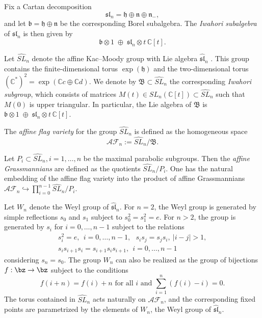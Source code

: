 \documentclass[10pt, a4paper, reqno]{amsart}
\begin{document}
Fix a Cartan decomposition 
\[
\mathfrak{sl}_n = \mathfrak{h} \oplus \mathfrak{n} \oplus \mathfrak{n}_-,
\]
and let $\mathfrak{b} = \mathfrak{h} \oplus \mathfrak{n}$ be the corresponding Borel subalgebra. 
The \emph{Iwahori subalgebra} of $\widehat{\mathfrak{sl}}_n$ is then given by
\[
\mathfrak{b} \otimes 1 \;\oplus\; \mathfrak{sl}_n \otimes t\,\mathbb{C}[t].
\]


Let $\widehat{SL}_n$ denote the affine Kac--Moody group with Lie algebra $\widehat{\mathfrak{sl}}_n$  {\cite{k}}. 
This group contains the finite-dimensional torus $\exp(\mathfrak{h})$ 
and the two-dimensional torus $(\mathbb{C}^*)^2 = \exp(\mathbb{C}c \oplus \mathbb{C}d)$. 
We denote by $\mathfrak{B} \subset \widehat{SL}_n$ the corresponding \emph{Iwahori subgroup}, 
which consists of matrices 
$M(t) \in SL_n(\mathbb{C}[t]) \subset \widehat{SL}_n$ 
such that $M(0)$ is upper triangular. 
In particular, the Lie algebra of $\mathfrak{B}$ is 
$\mathfrak{b} \otimes 1 \;\oplus\; \mathfrak{sl}_n \otimes t\,\mathbb{C}[t]$.


\begin{defe}
	The \emph{affine flag variety} for the group  $\widehat{SL}_n$ is defined as the homogeneous space
	\[
	\mathscr{AF}_n:= \widehat{SL}_n / \mathfrak{B}.
	\]
\end{defe}
Let $P_i\subset \widehat{SL}_n, i=1,\ldots,n$ be the maximal parabolic subgroups. Then the \emph{affine Grassmannians} are defined as the quotients $\widehat{SL}_n/P_i$.  One has the natural embedding of the affine flag variety into the product of affine Grassmannians $\mathscr{AF}_n\hookrightarrow \prod_{i=0}^{n-1} \widehat{SL}_n/P_i$.


\begin{rema}Let $W_n$ denote the Weyl group of $\widehat{\mathfrak{sl}}_n$. For $n=2$, the  Weyl group is generated by simple reflections $s_0$ and $s_1$ subject to $s_0^2=s_1^2=e$. For $n>2$, the group is generated by $s_i$ for $i=0,\ldots,n-1$ subject to the relations
	\begin{align*}
		s^2_i=e,~~i=0,\ldots,n-1, ~~~s_is_j=s_js_i,~|i-j|>1,\\
		s_is_{i+1}s_i=s_{i+1}s_is_{i+1}, ~~i=0,\ldots,n-1
	\end{align*}
	considering $s_n=s_0$. The group $W_n$ can also be realized as the group of bijections $f:\bz\to \bz$ subject to the conditions
	\[f(i+n)=f(i)+n \text{ for all $i$ and }\sum_{i=1}^{n}(f(i)-i)=0.\]
	The torus contained in $\widehat{SL}_n$ acts naturally on $\mathscr{AF}_n$, and the corresponding fixed points are parametrized by the elements of $W_n$, the Weyl group of $\widehat{\mathfrak{sl}}_n$.
\end{rema}
\end{document}
